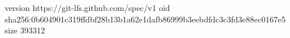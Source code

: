 version https://git-lfs.github.com/spec/v1
oid sha256:0b604901c319ffdbf28b13b1a62e1dafb86999b3eebdfdc3c3fd3e88ec0167e5
size 393312
